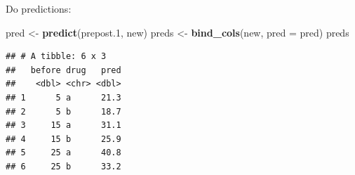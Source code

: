 \documentclass[
  ignorenonframetext,
]{beamer}
\newenvironment{Shaded}{\begin{snugshade}}{\end{snugshade}}
\newcommand{\DataTypeTok}[1]{\textcolor[rgb]{0.13,0.29,0.53}{#1}}
\newcommand{\FloatTok}[1]{\textcolor[rgb]{0.00,0.00,0.81}{#1}}
\newcommand{\KeywordTok}[1]{\textcolor[rgb]{0.13,0.29,0.53}{\textbf{#1}}}
\newcommand{\NormalTok}[1]{#1}
\newcommand{\StringTok}[1]{\textcolor[rgb]{0.31,0.60,0.02}{#1}}
\begin{document}
\begin{frame}[fragile]{Do predictions:}
\protect\hypertarget{do-predictions}{}

\begin{Shaded}
\begin{Highlighting}[]
\NormalTok{pred <-}\StringTok{ }\KeywordTok{predict}\NormalTok{(prepost}\FloatTok{.1}\NormalTok{, new)}
\NormalTok{preds <-}\StringTok{ }\KeywordTok{bind_cols}\NormalTok{(new, }\DataTypeTok{pred =}\NormalTok{ pred)}
\NormalTok{preds}
\end{Highlighting}
\end{Shaded}

\begin{verbatim}
## # A tibble: 6 x 3
##   before drug   pred
##    <dbl> <chr> <dbl>
## 1      5 a      21.3
## 2      5 b      18.7
## 3     15 a      31.1
## 4     15 b      25.9
## 5     25 a      40.8
## 6     25 b      33.2
\end{verbatim}

\end{frame}
\end{document}
